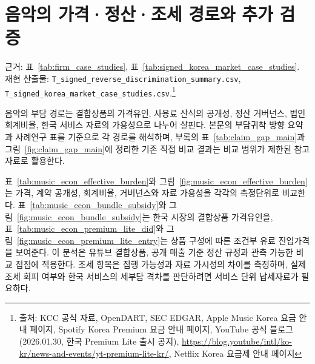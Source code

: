 \documentclass[11pt,a4paper]{report}
\newcommand{\sourcefootnote}[1]{\footnote{출처: #1}}
\newcommand{\srcYouTubeLite}{YouTube 공식 블로그 (2026.01.30, 한국 Premium Lite 출시 공지), \url{https://blog.youtube/intl/ko-kr/news-and-events/yt-premium-lite-kr/}}
\newcommand{\srcAppleMusicKR}{Apple Music Korea 요금 안내 페이지}
\newcommand{\srcSpotifyKR}{Spotify Korea Premium 요금 안내 페이지}
\newcommand{\srcNetflixKR}{Netflix Korea 요금제 안내 페이지}
\begin{document}
\section{음악의 가격·정산·조세 경로와 추가 검증}\label{sec:music_extended}
{\par\raggedright\footnotesize 근거: 표~\ref{tab:firm_case_studies}, 표~\ref{tab:signed_korea_market_case_studies}.\\
재현 산출물: \nolinkurl{T_signed_reverse_discrimination_summary.csv}, \nolinkurl{T_signed_korea_market_case_studies.csv}.\sourcefootnote{KCC 공식 자료, OpenDART, SEC EDGAR, \srcAppleMusicKR, \srcSpotifyKR, \srcYouTubeLite, \srcNetflixKR}\par}

음악의 부담 경로는 결합상품의 가격유인, 사용료 산식의 공개성, 정산 거버넌스, 법인 회계비율, 한국 서비스 자료의 가용성으로 나누어 살핀다. 본문의 부담귀착 방향 요약과 사례연구 표를 기준으로 각 경로를 해석하며, 부록의 표~\ref{tab:claim_gap_main}과 그림~\ref{fig:claim_gap_main}에 정리한 기존 직접 비교 결과는 비교 범위가 제한된 참고자료로 활용한다.

표~\ref{tab:music_econ_effective_burden}와 그림~\ref{fig:music_econ_effective_burden}는 가격, 계약 공개성, 회계비율, 거버넌스와 자료 가용성을 각각의 측정단위로 비교한다. 표~\ref{tab:music_econ_bundle_subsidy}와 그림~\ref{fig:music_econ_bundle_subsidy}는 한국 시장의 결합상품 가격유인을, 표~\ref{tab:music_econ_premium_lite_did}와 그림~\ref{fig:music_econ_premium_lite_entry}는 상품 구성에 따른 조건부 유료 진입가격을 보여준다. 이 분석은 유튜브 결합상품, 공개 매출 기준 정산 규정과 관측 가능한 비교 접점에 적용한다. 조세 항목은 집행 가능성과 자료 가시성의 차이를 측정하며, 실제 조세 회피 여부와 한국 서비스의 세부담 격차를 판단하려면 서비스 단위 납세자료가 필요하다.
\end{document}
